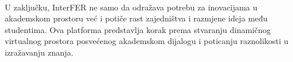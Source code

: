 \paragraph{}
U zaključku, InterFER ne samo da odražava potrebu za inovacijama u 
akademskom prostoru već i potiče rast zajedništva i razmjene ideja među 
studentima. Ova platforma predstavlja korak prema stvaranju dinamičnog 
virtualnog prostora posvećenog akademskom dijalogu i poticanju 
raznolikosti u izražavanju znanja.


\eject
